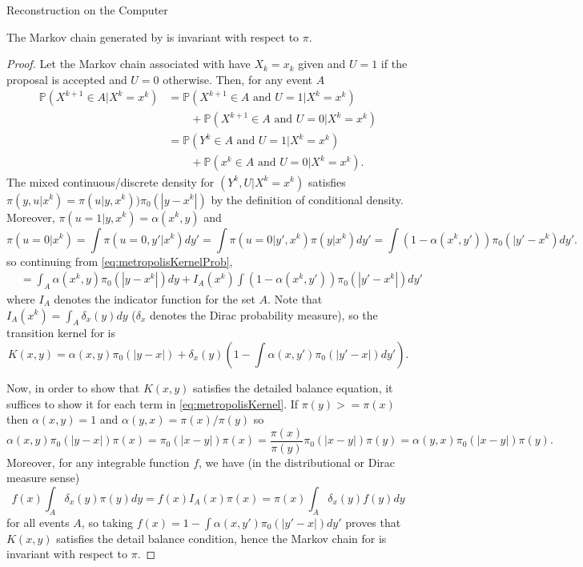 \begin{chapter}{Reconstruction on the Computer}
\begin{prop}
  The Markov chain generated by  is invariant with respect to $\pi$.
\end{prop}
\begin{proof}
Let the Markov chain associated with  have $X_k=x_k$ given and $U=1$ if the proposal is accepted and $U=0$ otherwise. 
Then, for any event $A$ 
\begin{align}
  \mathbb P\left( X^{k+1} \in A | X^k = x^k \right)
    &= \mathbb P\left( X^{k+1} \in A\text{ and } U = 1 |X^k=x^k \right) \nonumber\\
    &\quad\quad+ \mathbb P\left(X^{k+1} \in A\text{ and } U = 0| X^k=x^k \right) \nonumber \\
    &= \mathbb P\left( Y^k \in A\text{ and } U = 1 |X^k=x^k \right) \nonumber\\
    &\quad\quad+ \mathbb P\left(x^k \in A\text{ and } U = 0| X^k=x^k \right). \label{eq:metropolisKernelProb}
\end{align}
The mixed continuous/discrete density for $(Y^k,U|X^k = x^k)$ satisfies $\pi(y,u|x^k) = \pi(u|y,x^k))\pi_0(|y-x^k|)$ by the definition of conditional density.  
Moreover, $\pi(u=1|y,x^k) = \alpha(x^k,y)$ 
and 
\begin{equation*}
  \pi(u=0|x^k) = \int \pi(u=0,y'|x^k)dy' = \int \pi(u=0|y',x^k)\pi(y|x^k)dy' = \int (1-\alpha(x^k,y'))\pi_0(|y'-x^k)dy'.
\end{equation*}
so continuing from \eqref{eq:metropolisKernelProb},
\begin{align}
    &= \int_A \alpha(x^k,y)\pi_0(|y-x^k|)dy + I_A(x^k) \int (1 - \alpha(x^k,y'))\pi_0(|y'-x^k|)dy'
\end{align}
where $I_A$ denotes the indicator function for the set $A$.
Note that $I_A(x^k) = \int_A \delta_x(y)dy$ ($\delta_x$ denotes the Dirac probability measure), so the transition kernel for  is
\begin{equation} \label{eq:metropolisKernel}
  K(x,y) = \alpha(x,y)\pi_0(|y-x|) + \delta_x(y) \left(1 - \int \alpha(x,y')\pi_0(|y'-x|)dy'\right).
\end{equation}

Now, in order to show that $K(x,y)$ satisfies the detailed balance equation, it suffices to show it for each term in \eqref{eq:metropolisKernel}.
If $\pi(y) >= \pi(x)$ then $\alpha(x,y) = 1$ and $\alpha(y,x) = \pi(x)/\pi(y)$ so 
\begin{equation}
  \alpha(x,y)\pi_0(|y-x|)\pi(x) = \pi_0(|x-y|)\pi(x) = \frac{\pi(x)}{\pi(y)}\pi_0(|x-y|)\pi(y) = \alpha(y,x)\pi_0(|x-y|)\pi(y).
\end{equation}
Moreover, for any integrable function $f$, we have (in the distributional or Dirac measure sense)
\begin{equation}
  f(x)\int_A \delta_x(y) \pi(y)dy = f(x)I_A(x)\pi(x) = \pi(x)\int_A \delta_x(y) f(y)dy
\end{equation}
for all events $A$, so taking $f(x) = 1 - \int\alpha(x,y')\pi_0(|y'-x|)dy'$ proves that $K(x,y)$ satisfies the detail balance condition, hence the Markov chain for  is invariant with respect to $\pi$.
\end{proof}


\end{chapter}
